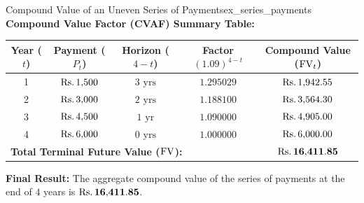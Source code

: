 \begin{example}{Compound Value of an Uneven Series of Payments}{ex_series_payments}
\tcbline
\textbf{Compound Value Factor (CVAF) Summary Table:}
\begin{center}
\footnotesize
\setlength{\tabcolsep}{3.5pt}
\begin{tabular}{ccccc}
\toprule
\textbf{Year ($t$)} & \textbf{Payment ($P_t$)} & \textbf{Horizon ($4 - t$)} & \textbf{Factor $(1.09)^{4-t}$} & \textbf{Compound Value ($\operatorname{FV}_t$)} \\
\midrule
1 & $\text{Rs.}\, 1{,}500$ & $3\text{ yrs}$ & $1.295029$ & $\text{Rs.}\, 1{,}942.55$ \\
2 & $\text{Rs.}\, 3{,}000$ & $2\text{ yrs}$ & $1.188100$ & $\text{Rs.}\, 3{,}564.30$ \\
3 & $\text{Rs.}\, 4{,}500$ & $1\text{ yr}$ & $1.090000$ & $\text{Rs.}\, 4{,}905.00$ \\
4 & $\text{Rs.}\, 6{,}000$ & $0\text{ yrs}$ & $1.000000$ & $\text{Rs.}\, 6{,}000.00$ \\
\midrule
\multicolumn{4}{l}{\textbf{Total Terminal Future Value ($\operatorname{FV}$):}} & $\mathbf{\text{Rs.}\, 16{,}411.85}$ \\
\bottomrule
\end{tabular}
\end{center}

\textbf{Final Result:}
The aggregate compound value of the series of payments at the end of $4$ years is $\mathbf{\text{Rs.}\, 16{,}411.85}$.
\end{example}

